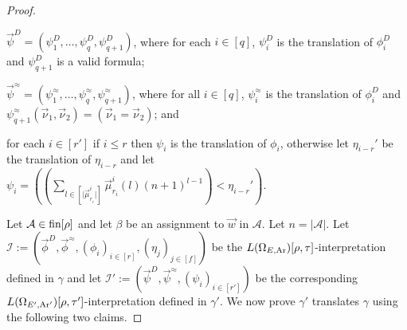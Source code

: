 \documentclass[../main/thesis.tex]{subfiles}
\begin{document}
\begin{proof}
\begin{myitemize}
  \item $\vec{\psi}^D = (\psi^D_1, \ldots, \psi^D_{q}, \psi^D_{q+1})$, where for
    each $i \in [q]$, $\psi^D_i$ is the translation of $\phi^D_i$ and
    $\psi^D_{q+1}$ is a valid formula;
  \item $\vec{\psi}^{\approx} = (\psi^{\approx}_1, \ldots, \psi^{\approx}_q,
    \psi^{\approx}_{q+1})$, where for all $i \in [q]$, $\psi^{\approx}_i$ is the
    translation of $\phi^D_i$ and $\psi^{\approx}_{q+1}(\vec{\nu}_1,
    \vec{\nu}_2) = (\vec{\nu}_1 = \vec{\nu}_2)$; and
  \item for each $i \in [r']$ if $i \leq r$ then $\psi_i$ is the translation of
    $\phi_i$, otherwise let $\eta_{i - r}'$ be the translation of $\eta_{i - r}$
    and let $\psi_i = ((\sum_{l \in [\vert \vec{\mu}^i_{r_i} \vert]}
    \vec{\mu}^i_{r_{i}}(l)(n+1)^{l-1}) < \eta_{i-r}')$.
  \end{myitemize}

  Let $\mathcal{A} \in \text{\upshape fin}{[\rho]}$ and let $\beta$ be an assignment to $\vec{w}$
  in $\mathcal{A}$. Let $n = \vert \mathcal{A} \vert$. Let $\mathcal{I} :=
  (\vec{\phi}^D, \vec{\phi}^{\approx}, (\phi_i)_{i \in [r]}, (\eta_j)_{j \in
    [f]})$ be the $L(\Omega_{E, \text{\upshape Ar}})[\rho, \tau]$-interpretation defined in
  $\gamma$ and let $\mathcal{I}' := (\vec{\psi}^D, \vec{\psi}^{\approx},
  (\psi_i)_{i \in [r']})$ be the corresponding $L(\Omega_{E', \text{\upshape Ar}'})[\rho,
  \tau']$-interpretation defined in $\gamma'$. We now prove $\gamma'$ translates
  $\gamma$ using the following two claims.



\end{proof}
\end{document}
